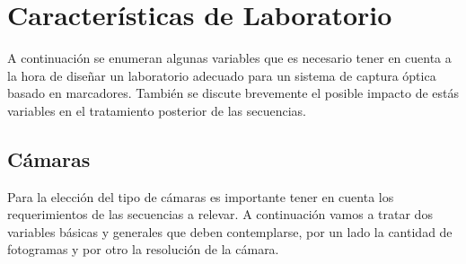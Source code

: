 %
%
%
%
%
%
%
%
%


\section{Características de Laboratorio}
\label{seccion_Caracteristicas_Laboratorio}
 
A continuación se enumeran algunas variables que es necesario tener en cuenta a la hora de diseñar un laboratorio adecuado para un sistema de captura óptica basado en marcadores. También se discute brevemente el posible impacto de estás variables en el tratamiento posterior de las secuencias.

\subsection{Cámaras}\label{parrafo_Camaras} 
Para la elección del tipo de cámaras es importante tener en cuenta los requerimientos de las secuencias a relevar. A continuación vamos a tratar dos variables básicas y generales que deben contemplarse, por un lado la cantidad de fotogramas y por otro la resolución de la cámara.

